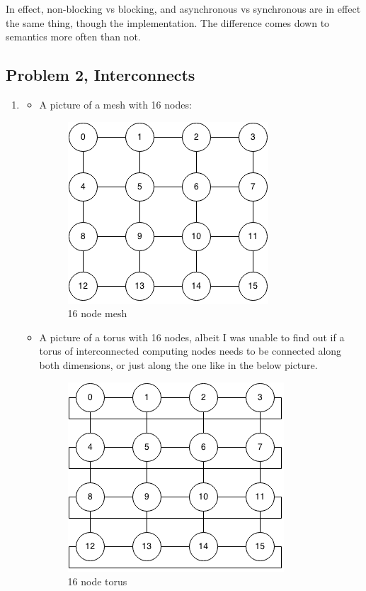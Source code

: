 \documentclass[fontsize=11pt, paper=a4, titlepage]{article}
\begin{document}
In effect, non-blocking vs blocking, and asynchronous vs synchronous are in
effect the same thing, though the implementation. The difference comes down to
semantics more often than not.

\subsection{Problem 2, Interconnects}

\begin{enumerate}
\renewcommand{\theenumi}{\alph{enumi})}

    \item
    \begin{itemize}
        \item A picture of a mesh with 16 nodes:
        \begin{figure}[H]
            \centering
            \includegraphics[width=0.4\linewidth]{16_node_mesh.png}
            \caption{16 node mesh}
            \label{fig:mesh}
        \end{figure}

        \item A picture of a torus with 16 nodes, albeit I was unable to find
out if a torus of interconnected computing nodes needs to be connected along
both dimensions, or just along the one like in the below picture.
        \begin{figure}[H]
            \centering
            \includegraphics[width=0.4\linewidth]{16_node_torus_1d.png}
            \caption{16 node torus}
            \label{fig:torus}
        \end{figure}


\end{itemize}
\end{enumerate}
\end{document}
